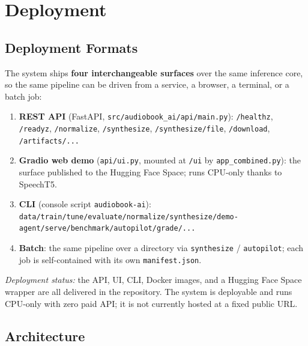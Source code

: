 \documentclass[12pt,a4paper]{article}
\begin{document}
\section{Deployment}

\subsection{Deployment Formats}

The system ships \textbf{four interchangeable surfaces} over the same inference core, so the same pipeline can be driven from a service, a browser, a terminal, or a batch job:

\begin{enumerate}
  \item \textbf{REST API} (FastAPI, \texttt{src/audiobook\_ai/api/main.py}): \texttt{/healthz}, \texttt{/readyz}, \texttt{/normalize}, \texttt{/synthesize}, \texttt{/synthesize/file}, \texttt{/download}, \texttt{/artifacts/...}
  \item \textbf{Gradio web demo} (\texttt{api/ui.py}, mounted at \texttt{/ui} by \texttt{app\_combined.py}): the surface published to the Hugging Face Space; runs CPU-only thanks to SpeechT5.
  \item \textbf{CLI} (console script \texttt{audiobook-ai}): \texttt{data/train/tune/evaluate/normalize/synthesize/demo-agent/serve/benchmark/autopilot/grade/...}
  \item \textbf{Batch}: the same pipeline over a directory via \texttt{synthesize} / \texttt{autopilot}; each job is self-contained with its own \texttt{manifest.json}.
\end{enumerate}

\noindent\textit{Deployment status:} the API, UI, CLI, Docker images, and a Hugging Face Space wrapper are all delivered in the repository. The system is deployable and runs CPU-only with zero paid API; it is not currently hosted at a fixed public URL.

\subsection{Architecture}
\end{document}
